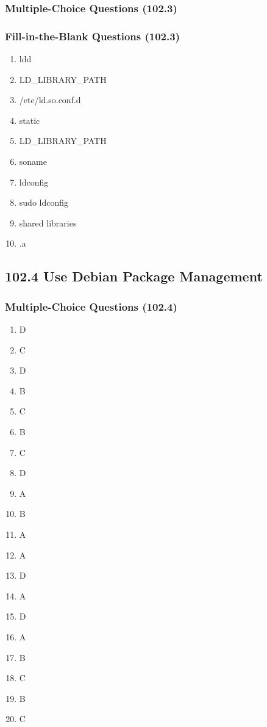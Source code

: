 \documentclass[a4paper]{report}
\begin{document}
\subsubsection*{Multiple-Choice Questions (102.3)}

\subsubsection*{Fill-in-the-Blank Questions (102.3)}
\begin{enumerate}[1.]

    \item ldd
    \item LD\_LIBRARY\_PATH
    \item /etc/ld.so.conf.d
    \item static
    \item LD\_LIBRARY\_PATH
    \item soname
    \item ldconfig
    \item sudo ldconfig
    \item shared libraries
    \item .a
\end{enumerate}



\subsection*{102.4 Use Debian Package Management}
\subsubsection*{Multiple-Choice Questions (102.4)}
\begin{enumerate}[1.]
    \item D
    \item C
    \item D
    \item B
    \item C
    \item B
    \item C
    \item D
    \item A
    \item B
    \item A
    \item A
    \item D
    \item A
    \item D
    \item A
    \item B
    \item C
    \item B
    \item C
\end{enumerate}
\end{document}

